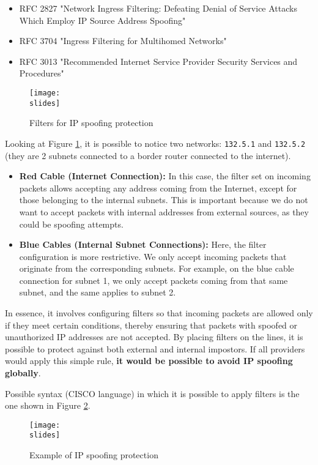 \begin{itemize}
    \item RFC 2827 "Network Ingress Filtering: Defeating Denial of Service Attacks Which Employ IP Source Address Spoofing"
    \item RFC 3704 "Ingress Filtering for Multihomed Networks"
    \item RFC 3013 "Recommended Internet Service Provider Security Services and Procedures"
\end{itemize}


\begin{figure}[h]
    \centering
    \texttt{[image: \\slides]}
    \caption{Filters for IP spoofing protection}
    \label{fig:ip-spoofing-filters}
\end{figure}

Looking at Figure \ref*{fig:ip-spoofing-filters}, it is possible to notice two networks: \texttt{132.5.1} and \texttt{132.5.2} (they are 2 subnets connected to a border router connected to the internet).

\begin{itemize}
    \item \textbf{Red Cable (Internet Connection):} In this case, the filter set on incoming packets allows accepting any address coming from the Internet, except for those belonging to the internal subnets. This is important because we do not want to accept packets with internal addresses from external sources, as they could be spoofing attempts.
    \item \textbf{Blue Cables (Internal Subnet Connections):} Here, the filter configuration is more restrictive. We only accept incoming packets that originate from the corresponding subnets. For example, on the blue cable connection for subnet 1, we only accept packets coming from that same subnet, and the same applies to subnet 2.
\end{itemize}
In essence, it involves configuring filters so that incoming packets are allowed only if they meet certain conditions, thereby ensuring that packets with spoofed or unauthorized IP addresses are not accepted.
By placing filters on the lines, it is possible to protect against both external and internal impostors. If all providers would apply this simple rule, \textbf{it would be possible to avoid IP spoofing globally}.

Possible syntax (CISCO language) in which it is possible to apply filters is the one shown in Figure \ref*{fig:ip-spoofing-example}.

\begin{figure}[h]
    \centering
    \texttt{[image: \\slides]}
    \caption{Example of IP spoofing protection}
    \label{fig:ip-spoofing-example}
\end{figure}